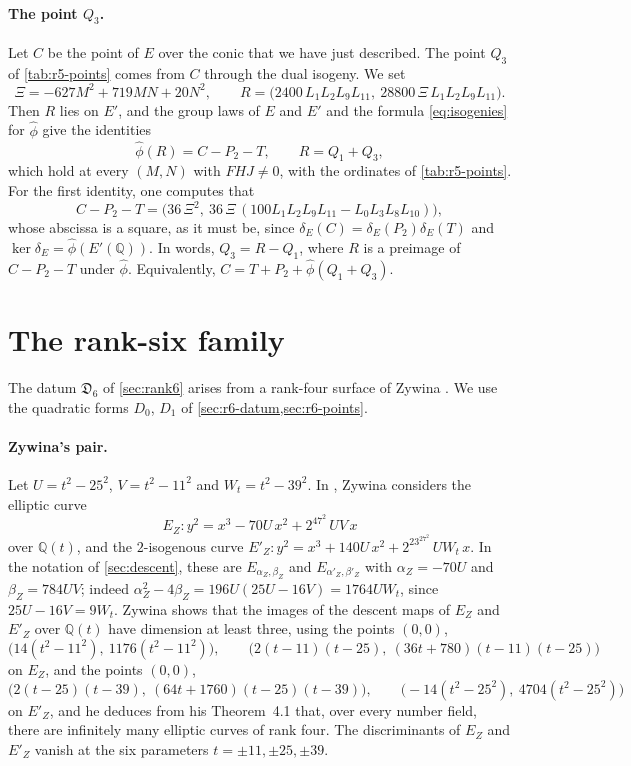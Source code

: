 \documentclass[12pt,oneside,openany]{book}
\theoremstyle{definition}
\theoremstyle{plain}
\numberwithin{equation}{chapter}
\theoremstyle{plain}
\theoremstyle{definition}
\theoremstyle{remark}
\newcommand{\Q}{\mathbb Q}
\newcommand{\dual}{\hat\phi}
\newcommand{\datum}{\mathfrak D}
\begin{document}
\paragraph{The point $Q_3$.} Let $C$ be the point of $E$ over the conic that we have just described. The point $Q_3$ of \cref{tab:r5-points} comes from $C$ through the dual isogeny. We set
\[
\Xi=-627M^2+719MN+20N^2,\qquad R=\bigl(2400\,L_1L_2L_9L_{11},\ 28800\,\Xi\,L_1L_2L_9L_{11}\bigr).
\]
Then $R$ lies on $E'$, and the group laws of $E$ and $E'$ and the formula \eqref{eq:isogenies} for $\dual$ give the identities
\begin{equation}\label{r5o:Q3}
\dual(R)=C-P_2-T,\qquad R=Q_1+Q_3,
\end{equation}
which hold at every $(M,N)$ with $FHJ\ne0$, with the ordinates of \cref{tab:r5-points}. For the first identity, one computes that
\[
C-P_2-T=\bigl(36\,\Xi^2,\ 36\,\Xi\,(100L_1L_2L_9L_{11}-L_0L_3L_8L_{10})\bigr),
\]
whose abscissa is a square, as it must be, since $\delta_E(C)=\delta_E(P_2)\delta_E(T)$ and $\ker\delta_E=\dual(E'(\Q))$. In words, $Q_3=R-Q_1$, where $R$ is a preimage of $C-P_2-T$ under $\dual$. Equivalently, $C=T+P_2+\dual(Q_1+Q_3)$.
\section{The rank-six family}\label{sec:origin-r6}

The datum $\datum_6$ of \cref{sec:rank6} arises from a rank-four surface of Zywina \cite[\S6.5]{Zywina2026}. We use the quadratic forms $D_0$, $D_1$ of \cref{sec:r6-datum,sec:r6-points}.

\paragraph{Zywina's pair.} Let $U=t^2-25^2$, $V=t^2-11^2$ and $W_t=t^2-39^2$. In \cite[\S6.5]{Zywina2026}, Zywina considers the elliptic curve
\begin{equation}\label{r6o:zywina}
E_Z\colon y^2=x^3-70U\,x^2+2^47^2\,UV\,x
\end{equation}
over $\Q(t)$, and the $2$-isogenous curve $E'_Z\colon y^2=x^3+140U\,x^2+2^23^27^2\,UW_t\,x$. In the notation of \cref{sec:descent}, these are $E_{\alpha_Z,\beta_Z}$ and $E_{\alpha'_Z,\beta'_Z}$ with $\alpha_Z=-70U$ and $\beta_Z=784UV$; indeed $\alpha_Z^2-4\beta_Z=196U(25U-16V)=1764UW_t$, since $25U-16V=9W_t$. Zywina shows that the images of the descent maps of $E_Z$ and $E'_Z$ over $\Q(t)$ have dimension at least three, using the points $(0,0)$,
\[
\bigl(14(t^2-11^2),\ 1176(t^2-11^2)\bigr),\qquad \bigl(2(t-11)(t-25),\ (36t+780)(t-11)(t-25)\bigr)
\]
on $E_Z$, and the points $(0,0)$,
\[
\bigl(2(t-25)(t-39),\ (64t+1760)(t-25)(t-39)\bigr),\qquad \bigl(-14(t^2-25^2),\ 4704(t^2-25^2)\bigr)
\]
on $E'_Z$,
and he deduces from his Theorem~4.1 that, over every number field, there are infinitely many elliptic curves of rank four. The discriminants of $E_Z$ and $E'_Z$ vanish at the six parameters $t=\pm11,\pm25,\pm39$.
\end{document}
